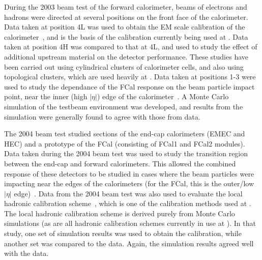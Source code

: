 During the 2003 beam test of the \atlas forward calorimeter, beams of electrons and hadrons were directed at several positions on the front face of the calorimeter. Data taken at position 4L was used to obtain the EM scale calibration of the calorimeter~\cite{Fcalpaper}, and is the basis of the calibration currently being used at \atlas. Data taken at position 4H was compared to that at 4L, and used to study the effect of additional upstream material on the detector performance. These studies have been carried out using cylindrical clusters of calorimeter cells, and also using topological clusters, which are used heavily at \atlas. Data taken at positions 1-3 were used to study the dependance of the FCal response on the beam particle impact point, near the inner (high $|\eta|$) edge of the calorimeter~\cite{LouiseThesis,TB03_tbp}. A Monte Carlo simulation of the testbeam environment was developed, and results from the simulation were generally found to agree with those from data. 


The 2004 beam test studied sections of the end-cap calorimeters (EMEC and HEC) and a prototype of the FCal (consisting of FCal1 and FCal2 modules). Data taken during the 2004 beam test was used to study the transition region between the end-cap and forward calorimeters. This allowed the combined response of these detectors to be studied in cases where the beam particles were impacting near the edges of the calorimeters (for the FCal, this is the outer/low $|\eta|$ edge)~\cite{TB2004pub}. Data from the 2004 beam test was also used to evaluate the local hadronic calibration scheme~\cite{nim_tbp}, which is one of the calibration methods used at \atlas. The local hadronic calibration scheme is derived purely from Monte Carlo simulations (as are all hadronic calibration schemes currently in use at \atlas). In that study, one set of simulation results was used to obtain the calibration, while another set was compared to the data. Again, the simulation results agreed well with the data.

